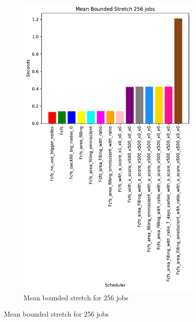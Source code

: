 \documentclass[a4paper]{article}
\begin{document}
\begin{figure}[H]
\begin{subfigure}[b]{0.4\linewidth}\centering\includegraphics[width=0.7\linewidth]{MBSS/plot/Results_Size_And_Data_2022-01-17->2022-01-17_V9532_Mean_Stretch_With_a_Minimum_256_450_128_32_256_4_1024.pdf}\caption{Mean bounded stretch for 256 jobs}\label{45}\end{subfigure}

\end{figure}
\end{document}
